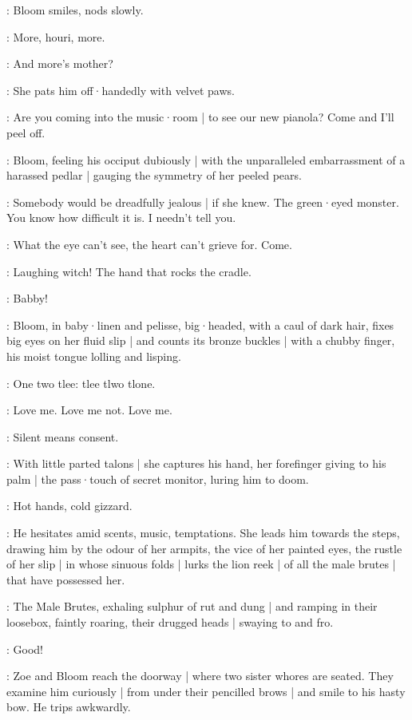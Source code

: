 :
Bloom smiles,
nods slowly.

\Bloom:
More,
houri,
more.

\Zoe:
And more's mother?

:
She pats him off·handedly with velvet paws.

\Zoe:
Are you coming into the music·room |
to see our new pianola?
Come and I'll peel off.

:
Bloom,
feeling his occiput dubiously |
with the unparalleled embarrassment of a harassed pedlar |
gauging the symmetry of her peeled pears.

\Bloom:
Somebody would be dreadfully jealous |
if she knew.
The green·eyed monster.
You know how difficult it is.
I needn't tell you.

\Zoe:
What the eye can't see,
the heart can't grieve for.
Come.

\Bloom:
Laughing witch!
The hand that rocks the cradle.

\Zoe:
Babby!

:
Bloom,
in baby·linen and pelisse,
big·headed,
with a caul of dark hair,
fixes big eyes on her fluid slip |
and counts its bronze buckles |
with a chubby finger,
his moist tongue lolling and lisping.

\Bloom:
One two tlee:
tlee tlwo tlone.

\Buckles[2]:
Love me.
Love me not.
Love me.

\Zoe:
Silent means consent.

:
With little parted talons |
she captures his hand,
her forefinger giving to his palm |
the pass·touch of secret monitor,
luring him to doom.

\Zoe:
Hot hands,
cold gizzard.

:
He hesitates amid scents,
music,
temptations.
She leads him towards the steps,
drawing him by the odour of her armpits,
the vice of her painted eyes,
the rustle of her slip |
in whose sinuous folds |
lurks the lion reek |
of all the male brutes |
that have possessed her.

:
The Male Brutes,
exhaling sulphur of rut and dung |
and ramping in their loosebox,
faintly roaring,
their drugged heads |
swaying to and fro.

\MaleBrutes:
Good!

:
Zoe and Bloom reach the doorway |
where two sister whores are seated.
They examine him curiously |
from under their pencilled brows |
and smile to his hasty bow.
He trips awkwardly.

